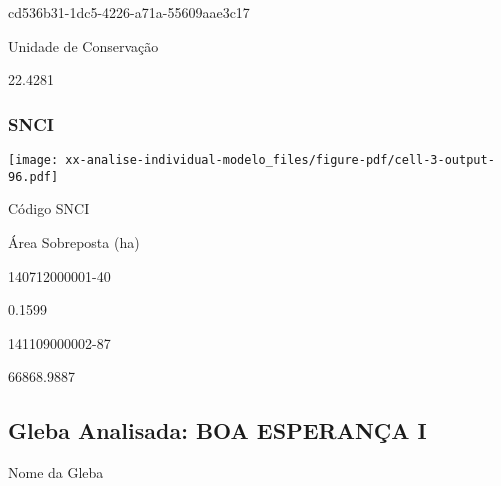 \documentclass[
  11pt,
  a4paper,
  DIV=11,
  numbers=noendperiod]{scrartcl}
\begin{document}
\n    

\n    

\n      

cd536b31-1dc5-4226-a71a-55609aae3c17

\n      

Unidade de Conservação

\n      

22.4281

\n    

\n  

\n

\subsubsection{SNCI}\label{snci-4}

\texttt{[image: xx-analise-individual-modelo\_files/figure-pdf/cell-3-output-96.pdf]}

\n  

\n    

\n      

Código SNCI

\n      

Área Sobreposta (ha)

\n    

\n  

\n  

\n    

\n      

140712000001-40

\n      

0.1599

\n    

\n    

\n      

141109000002-87

\n      

66868.9887

\n    

\n  

\n

\subsection{Gleba Analisada: BOA ESPERANÇA
I}\label{gleba-analisada-boa-esperanuxe7a-i}

\n  

\n    

\n      

Nome da Gleba

\n      
\end{document}
